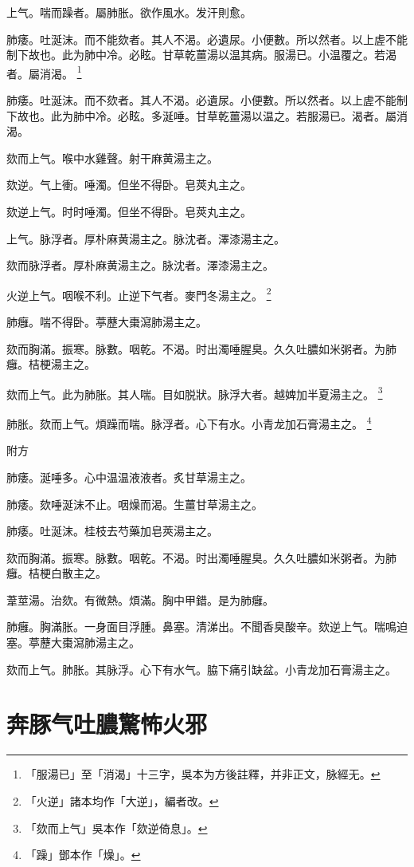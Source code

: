 上气。喘而躁者。屬肺胀。欲作風水。发汗則愈。

肺痿。吐涎沫。而不能欬者。其人不渴。必遺尿。小便數。所以然者。以上虗不能制下故也。此为肺中冷。必眩。甘草乾薑湯以温其病。服湯已。小温覆之。若渴者。屬消渴。{\wuben}
	\footnote{「服湯已」至「消渴」十三字，吳本为方後註釋，并非正文，脉經无。}

肺痿。吐涎沫。而不欬者。其人不渴。必遺尿。小便數。所以然者。以上虗不能制下故也。此为肺中冷。必眩。多涎唾。甘草乾薑湯以温之。若服湯已。渴者。屬消渴。{\dengben}

欬而上气。喉中水雞聲。射干麻黄湯主之。

欬逆。气上衝。唾濁。但坐不得卧。皂莢丸主之。{\wuben}

欬逆上气。时时唾濁。但坐不得卧。皂莢丸主之。{\dengben}

上气。脉浮者。厚朴麻黄湯主之。脉沈者。澤漆湯主之。{\wuben}

欬而脉浮者。厚朴麻黄湯主之。脉沈者。澤漆湯主之。{\dengben}


火逆上气。咽喉不利。止逆下气者。麥門冬湯主之。
	\footnote{「火逆」諸本均作「大逆」，編者改。}

肺癰。喘不得卧。葶藶大棗瀉肺湯主之。

欬而胸滿。振寒。脉數。咽乾。不渴。时出濁唾腥臭。久久吐膿如米粥者。为肺癰。桔梗湯主之。

欬而上气。此为肺胀。其人喘。目如脱狀。脉浮大者。越婢加半夏湯主之。
	\footnote{「欬而上气」吳本作「欬逆倚息」。}

肺胀。欬而上气。煩躁而喘。脉浮者。心下有水。小青龙加石膏湯主之。
	\footnote{「躁」鄧本作「燥」。}

附方

肺痿。涎唾多。心中温温液液者。炙甘草湯主之。

肺痿。欬唾涎沫不止。咽燥而渴。生薑甘草湯主之。

肺痿。吐涎沫。桂枝去芍藥加皂莢湯主之。

欬而胸滿。振寒。脉數。咽乾。不渴。时出濁唾腥臭。久久吐膿如米粥者。为肺癰。桔梗白散主之。

葦莖湯。治欬。有微熱。煩滿。胸中甲錯。是为肺癰。

肺癰。胸滿胀。一身面目浮腫。鼻塞。清涕出。不聞香臭酸辛。欬逆上气。喘鳴迫塞。葶藶大棗瀉肺湯主之。

欬而上气。肺胀。其脉浮。心下有水气。脇下痛引缺盆。小青龙加石膏湯主之。

\chapter{奔豚气吐膿驚怖火邪}

